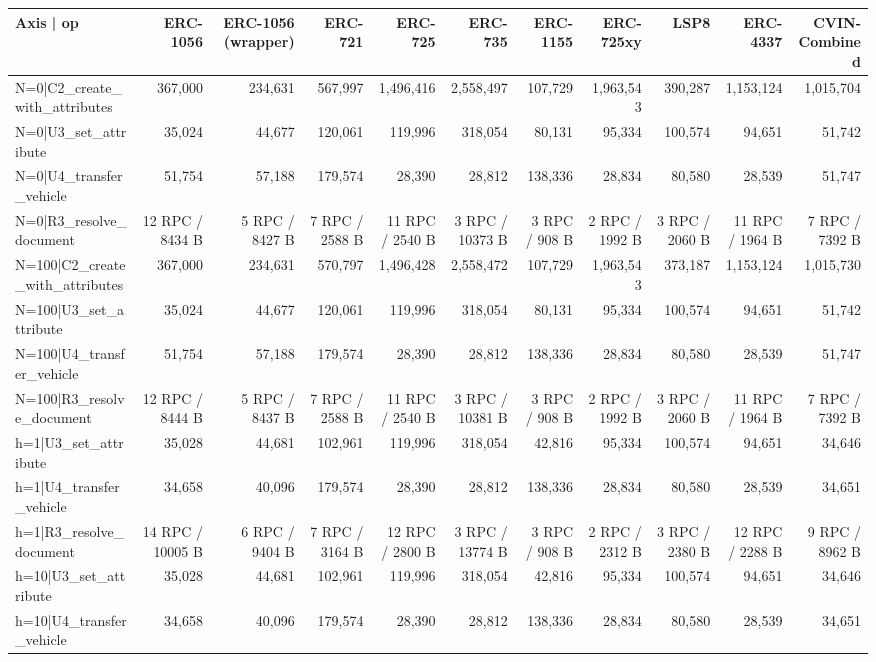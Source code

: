 \begin{table}[ht]
\centering
\small
\begin{tabular}{lrrrrrrrrrr}
\toprule
Axis | op & ERC-1056 & ERC-1056 (wrapper) & ERC-721 & ERC-725 & ERC-735 & ERC-1155 & ERC-725xy & LSP8 & ERC-4337 & CVIN-Combined \\
\midrule
N=0|C2\_create\_with\_attributes & 367,000 & 234,631 & 567,997 & 1,496,416 & 2,558,497 & 107,729 & 1,963,543 & 390,287 & 1,153,124 & 1,015,704 \\
N=0|U3\_set\_attribute & 35,024 & 44,677 & 120,061 & 119,996 & 318,054 & 80,131 & 95,334 & 100,574 & 94,651 & 51,742 \\
N=0|U4\_transfer\_vehicle & 51,754 & 57,188 & 179,574 & 28,390 & 28,812 & 138,336 & 28,834 & 80,580 & 28,539 & 51,747 \\
N=0|R3\_resolve\_document & 12 RPC / 8434 B & 5 RPC / 8427 B & 7 RPC / 2588 B & 11 RPC / 2540 B & 3 RPC / 10373 B & 3 RPC / 908 B & 2 RPC / 1992 B & 3 RPC / 2060 B & 11 RPC / 1964 B & 7 RPC / 7392 B \\
N=100|C2\_create\_with\_attributes & 367,000 & 234,631 & 570,797 & 1,496,428 & 2,558,472 & 107,729 & 1,963,543 & 373,187 & 1,153,124 & 1,015,730 \\
N=100|U3\_set\_attribute & 35,024 & 44,677 & 120,061 & 119,996 & 318,054 & 80,131 & 95,334 & 100,574 & 94,651 & 51,742 \\
N=100|U4\_transfer\_vehicle & 51,754 & 57,188 & 179,574 & 28,390 & 28,812 & 138,336 & 28,834 & 80,580 & 28,539 & 51,747 \\
N=100|R3\_resolve\_document & 12 RPC / 8444 B & 5 RPC / 8437 B & 7 RPC / 2588 B & 11 RPC / 2540 B & 3 RPC / 10381 B & 3 RPC / 908 B & 2 RPC / 1992 B & 3 RPC / 2060 B & 11 RPC / 1964 B & 7 RPC / 7392 B \\
h=1|U3\_set\_attribute & 35,028 & 44,681 & 102,961 & 119,996 & 318,054 & 42,816 & 95,334 & 100,574 & 94,651 & 34,646 \\
h=1|U4\_transfer\_vehicle & 34,658 & 40,096 & 179,574 & 28,390 & 28,812 & 138,336 & 28,834 & 80,580 & 28,539 & 34,651 \\
h=1|R3\_resolve\_document & 14 RPC / 10005 B & 6 RPC / 9404 B & 7 RPC / 3164 B & 12 RPC / 2800 B & 3 RPC / 13774 B & 3 RPC / 908 B & 2 RPC / 2312 B & 3 RPC / 2380 B & 12 RPC / 2288 B & 9 RPC / 8962 B \\
h=10|U3\_set\_attribute & 35,028 & 44,681 & 102,961 & 119,996 & 318,054 & 42,816 & 95,334 & 100,574 & 94,651 & 34,646 \\
h=10|U4\_transfer\_vehicle & 34,658 & 40,096 & 179,574 & 28,390 & 28,812 & 138,336 & 28,834 & 80,580 & 28,539 & 34,651 \\

\end{tabular}
\end{table}
